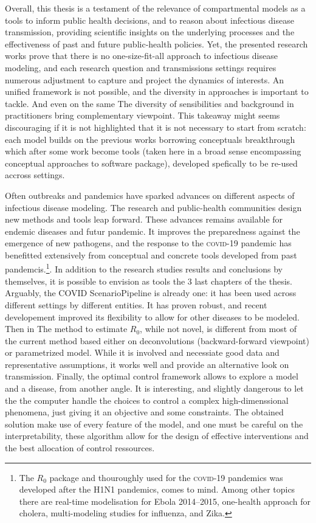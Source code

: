 Overall, this thesis is a testament of the relevance of compartmental models as a tools to inform public health decisions, and to reason about infectious disease transmission, providing scientific insights on the underlying processes and the effectiveness of past and future public-health policies. Yet, the presented research works prove that there is no one-size-fit-all approach to infectious disease modeling, and each research question and transmissions settings requires numerous adjustment to capture and project the dynamics of interests. An unified framework is not possible, and the diversity in approaches is important to tackle.  And even on the same The diversity of sensibilities and background in practitioners bring complementary viewpoint.
  This takeaway might seems discouraging if it is not highlighted that it is not necessary to start from scratch: each model builds on the previous works borrowing conceptuals breakthrough which after some work become tools (taken here in a broad sense encompassing conceptual approaches to software package), developed spefically to be re-used accross settings.
  
  Often outbreaks and pandemics have sparked advances on different aspects of infectious disease modeling. The research and public-health communities design new methods and tools leap forward. These advances remains available for endemic diseases and futur pandemic. It improves the preparedness  against the emergence of new pathogens, and the response to the \textsc{covid}-19 pandemic has benefitted extensively from conceptual and concrete tools developed from past pandemcis.\footnote{The $R_0$ package and thouroughly used for the \textsc{covid}-19 pandemics was developed after the H1N1 pandemics, comes to mind. Among other topics there are \eg real-time modelisation for Ebola 2014--2015, one-health approach for cholera, multi-modeling studies for influenza, and Zika.}. 
  In addition to the research studies results and conclusions by themselves, it is possible to envision as tools the 3 last chapters of the thesis. Arguably, the COVID ScenarioPipeline is already one: it has been used across different settings by different entities. It has proven robust, and recent developement improved its flexibility to allow for other diseases to be modeled. Then in The method to estimate $R_0$, while not novel, is different from most of the current method based either on deconvolutions (backward-forward viewpoint) or parametrized model. While it is involved and necessiate good data and representative assumptions, it works well and provide an alternative look on transmission.
Finally, the optimal control framework allows to explore a model and a disease, from another angle. It is interesting, and slightly dangerous to let the the computer handle the choices to control a complex high-dimenssional  phenomena, just giving it an objective and some constraints. The obtained solution make use of every feature of the model, and one must be careful on the interpretability, these algorithm allow for the design of effective interventions and the best allocation of control ressources. 

